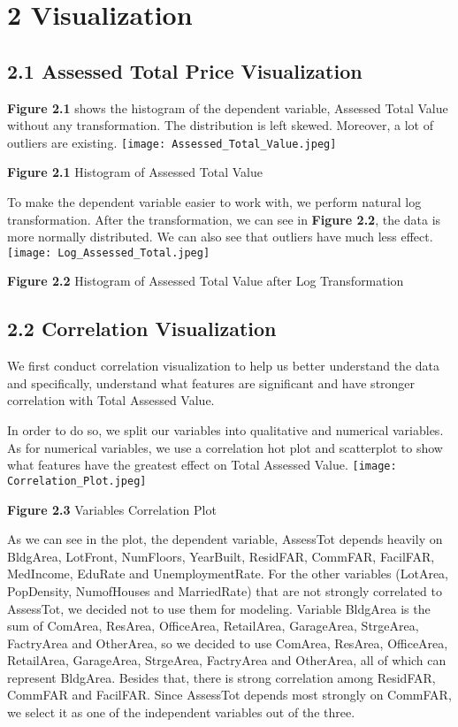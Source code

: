 \documentclass[9pt,twocolumn,twoside]{pnas-new}
\begin{document}
\section*{2 Visualization} 
\subsection*{2.1 Assessed Total Price Visualization}
\textbf{Figure 2.1} shows the histogram of the dependent variable, Assessed Total Value without any transformation. The distribution is left skewed. Moreover, a lot of outliers are existing. \newline
\texttt{[image: Assessed\_Total\_Value.jpeg]} 
\begin{center}
\textbf{Figure 2.1} Histogram of Assessed Total Value
\end{center}

\noindent To make the dependent variable easier to work with, we perform natural log transformation. After the transformation, we can see in \textbf{Figure 2.2}, the data is more normally distributed. We can also see that outliers have much less effect.
\texttt{[image: Log\_Assessed\_Total.jpeg]} 
\begin{center}
\textbf{Figure 2.2} Histogram of Assessed Total Value after Log Transformation 
\end{center}


\subsection*{2.2 Correlation Visualization}
We first conduct correlation visualization to help us better understand the data and specifically, understand what features are significant and have stronger correlation with Total Assessed Value.  \newline

\noindent In order to do so, we split our variables into qualitative and numerical variables. As for numerical variables, we use a correlation hot plot and scatterplot to show what features have the greatest effect on Total Assessed Value. \newline
\texttt{[image: Correlation\_Plot.jpeg]} 
\begin{center}
\textbf{Figure 2.3} Variables Correlation Plot 
\end{center}

\noindent As we can see in the plot, the dependent variable, AssessTot depends heavily on BldgArea, LotFront, NumFloors, YearBuilt, ResidFAR, CommFAR, FacilFAR, MedIncome, EduRate and UnemploymentRate. For the other variables (LotArea, PopDensity, NumofHouses and MarriedRate) that are not strongly correlated to AssessTot, we decided not to use them for modeling. Variable BldgArea is the sum of ComArea, ResArea, OfficeArea, RetailArea, GarageArea, StrgeArea, FactryArea and OtherArea, so we decided to use ComArea, ResArea, OfficeArea, RetailArea, GarageArea, StrgeArea, FactryArea and OtherArea, all of which can represent BldgArea. Besides that, there is strong correlation among ResidFAR, CommFAR and FacilFAR. Since AssessTot depends most strongly on CommFAR, we select it as one of the independent variables out of the three.
\end{document}
